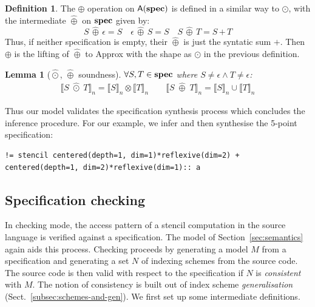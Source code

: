 \documentclass[9pt]{sigplanconf}
\newcounter{block}
\newtheorem{lemma}[block]{Lemma}
\theoremstyle{definition}
\newtheorem{definition}[block]{Definition}
\newcommand{\interp}[1]{\llbracket{#1}\rrbracket}
\newcommand{\term}[1]{\texttt{#1}}
\begin{document}
\begin{definition}The $\oplus$ operation on $\textsf{A}(\textbf{spec})$ 
is defined in a similar way to $\odot$, with the intermediate $\hat{\oplus}$ on
$\textbf{spec}$ given by:
\begin{equation*}
S \,\hat{\oplus}\, \epsilon = S \quad
\epsilon \,\hat{\oplus}\, S = S \quad
S \, \hat{\oplus} \, T = S \, \term{+} \, T
\end{equation*}
Thus, if neither specification is empty, their $\hat{\oplus}$ is just
the syntatic sum $\term{+}$. Then $\oplus$ is the lifting of
$\hat{\oplus}$ to \textsf{Approx} with the shape as $\odot$ in the previous
definition.
\end{definition}

\begin{lemma}[$\hat{\odot}$, $\hat{\oplus}$ soundness]$\forall S,
  T \in \textbf{spec}$ where $S\!\neq \epsilon \wedge T\!\neq \epsilon$:
\begin{align*}
\interp{S \; \hat{\odot} \; T}_n = \interp{S}_n \otimes \interp{T}_n
  \qquad
\interp{S \; \hat{\oplus} \; T}_n = \interp{S}_n \cup \interp{T}_n
\end{align*}
\label{lem:alg-soundness}
\vspace{-2em}
\end{lemma}
%
\noindent
Thus our model validates the specification synthesis process which concludes the
inference procedure. For our example, we infer and then synthesise the
5-point specification:
\begin{verbatim}
!= stencil centered(depth=1, dim=1)*reflexive(dim=2) + centered(depth=1, dim=2)*reflexive(dim=1):: a
\end{verbatim}

\subsection{Specification checking\label{subsec:checking}}

In checking mode, the access pattern of a stencil computation in the
source language is verified against a specification. The model of
Section~\ref{sec:semantics} again aids this process.  Checking
proceeds by generating a model $M$ from a specification and generating a set $N$ of indexing
schemes from the source code. The source code is then valid with
respect to the specification if $N$ is \emph{consistent} with $M$. The
notion of consistency is built out of index scheme 
\emph{generalisation} (Sect.~\ref{subsec:schemes-and-gen}). 
We first set up some intermediate definitions.%
\end{document}
